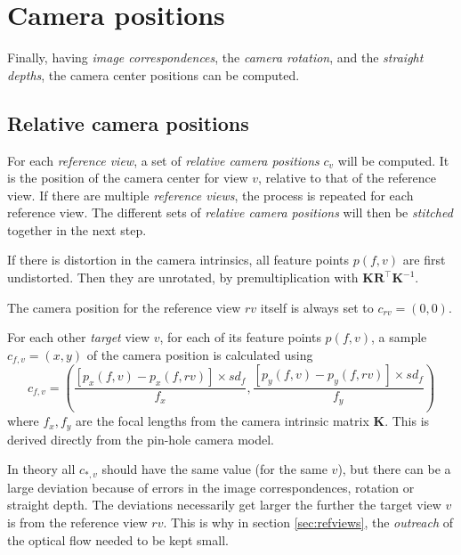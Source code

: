 \documentclass{scrreprt}
\newcommand{\matr}[1]{\mathbf{#1}}
\newcommand{\transpose}[1]{#1^\intercal}
\begin{document}
\pagebreak

\section{Camera positions}
\label{sec:campos}
Finally, having \emph{image correspondences}, the \emph{camera rotation}, and the \emph{straight depths}, the camera center positions can be computed.

\subsection{Relative camera positions}
For each \emph{reference view}, a set of \emph{relative camera positions} $c_v$ will be computed. It is the position of the camera center for view $v$, relative to that of the reference view. If there are multiple \emph{reference views}, the process is repeated for each reference view. The different sets of \emph{relative camera positions} will then be \emph{stitched} together in the next step.

If there is distortion in the camera intrinsics, all feature points $p(f,v)$ are first undistorted. Then they are unrotated, by premultiplication with $\matr{K} \transpose{\matr{R}} \matr{K}^{-1}$.

The camera position for the reference view $rv$  itself is always set to $c_{rv} = (0, 0)$. 

For each other \emph{target} view $v$, for each of its feature points $p(f,v)$, a sample $c_{f,v} = (x, y)$ of the camera position is calculated using
\begin{equation*}
c_{f,v} = \left( \frac{\left[p_x(f,v) - p_x(f,rv)\right] \times sd_f}{f_x}, \frac{\left[p_y(f,v) - p_y(f,rv)\right] \times sd_f}{f_y} \right)
\end{equation*}
where $f_x, f_y$ are the focal lengths from the camera intrinsic matrix $\matr{K}$. This is derived directly from the pin-hole camera model.

In theory all $c_{*,v}$ should have the same value (for the same $v$), but there can be a large deviation because of errors in the image correspondences, rotation or straight depth. The deviations necessarily get larger the further the target view $v$ is from the reference view $rv$. This is why in section \ref{sec:refviews}, the \emph{outreach} of the optical flow needed to be kept small.
\end{document}
